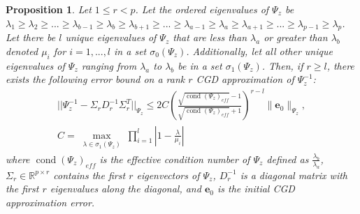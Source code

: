 \documentclass[11p]{elsarticle}
\numberwithin{equation}{section}
\newtheorem{proposition}{Proposition}
\newcommand{\vect}[1]{\ensuremath{\bm{#1}}}
\begin{document}
\begin{proposition}
Let $1\leq r<p$.  Let the ordered eigenvalues of 
    $\Psi_{z}$ be $\lambda_1 \geq \lambda_2 \geq ...\geq \lambda_{b-1} \geq \lambda_b \geq \lambda_{b+1} \geq  ... \geq \lambda_{a-1} \geq \lambda_a \geq \lambda_{a+1} \geq  ... \geq \lambda_{p-1} \geq \lambda_p$. Let there be $l$ unique eigenvalues of $\Psi_{z}$ that are less than $\lambda_a$ or greater than $\lambda_b$ denoted $\mu_i$ for $i=1,...,l$ in a set $\sigma_0(\Psi_{z})$.  Additionally, let all other unique eigenvalues of $\Psi_{z}$ ranging from $\lambda_a$ to $\lambda_b$ be in a set $\sigma_1(\Psi_{z})$.  Then, if $r \geq l$, there exists the following error bound on a rank $r$ CGD approximation of $\Psi_{z}^{-1}$:
    \begin{align}
    ||\Psi_{z}^{-1} - \Sigma_r D_r^{-1} \Sigma_r^T||_{\Psi_{z}} \leq 2C(\frac{\sqrt{\operatorname{cond}(\Psi_{z})_{eff}} - 1}{\sqrt{\operatorname{cond}(\Psi_{z})_{eff}} +1})^{r-l} \| \vect{e}_0\|_{\Psi_{z}}, \\
    C = \max\limits_{\substack{\lambda \in \sigma_1(\Psi_{z})}} \prod_{i=1}^{l} | 1-\frac{\lambda}{\mu_i}|
    \end{align}
where $\operatorname{cond}(\Psi_{z})_{eff}$ is the effective condition number of $\Psi_{z}$ defined as $\frac{\lambda_b}{\lambda_a}$, $\Sigma_r \in \mathbb{R}^{p \times r}$ contains the first $r$ eigenvectors of $\Psi_{z}$, $D_r^{-1}$ is a diagonal matrix with the first $r$ eigenvalues along the diagonal, and $\vect{e}_0$ is the initial CGD approximation error.
\label{prop:3}
\end{proposition}
\end{document}
